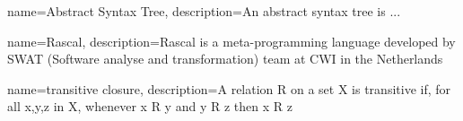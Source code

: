 \documentclass[main.tex]{subfiles}
\begin{document}
    {
        name=Abstract Syntax Tree,
        description={An abstract syntax tree is ...}
    }
    
    {
        name=Rascal,
        description={Rascal is a meta-programming language developed by SWAT (Software analyse and transformation) team at CWI in the Netherlands}
    }
    
    {
        name=transitive closure,
        description={A relation R on a set X is transitive if, for all x,y,z in X, whenever x R y and y R z then x R z}
    }
\end{document}
